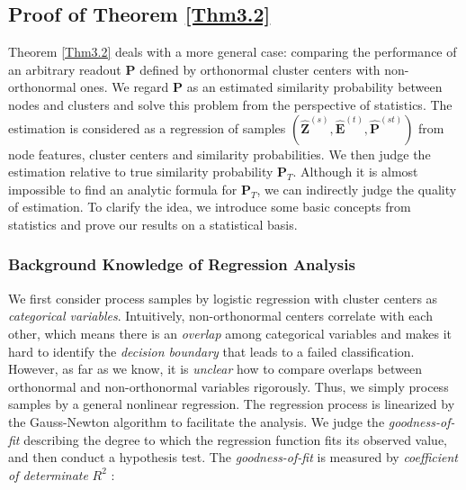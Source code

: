 \subsection{Proof of Theorem \ref{Thm3.2}}

Theorem \ref{Thm3.2} deals with a more general case: comparing the performance of an arbitrary readout $\bm P$ defined by orthonormal cluster centers with non-orthonormal ones. 
We regard $\bm P$ as an estimated similarity probability between nodes and clusters and solve this problem from the perspective of statistics. 
The estimation is considered as a regression of samples $(\hat{\bm Z}^{(s)}, \hat{\bm E}^{(t)}, \hat{\bm P}^{(st)})$ from node features, cluster centers and similarity probabilities. 
We then judge the estimation relative to true similarity probability $\bm P_T$. 
Although it is almost impossible to find an analytic formula for $\bm P_T$, we can indirectly judge the quality of estimation. To clarify the idea, we introduce some basic concepts from statistics and prove our results on a statistical basis. 


\subsubsection{Background Knowledge of Regression Analysis}\label{C2.1}

We first consider process samples by logistic regression with cluster centers as \emph{categorical variables}.
Intuitively, non-orthonormal centers correlate with each other, which means there is an \emph{overlap} among categorical variables and makes it hard to identify the \emph{decision boundary} that leads to a failed classification. However, as far as we know, it is \emph{unclear} how to compare overlaps between orthonormal and non-orthonormal variables rigorously. Thus, we simply process samples by a general nonlinear regression. 
The regression process is linearized by the Gauss-Newton algorithm to facilitate the analysis.
We judge the \emph{goodness-of-fit} describing the degree to which the regression function fits its observed value, and then conduct a hypothesis test. The \emph{goodness-of-fit} is measured by \emph{coefficient of determinate} $R^2$ \cite{Kutner1985}:

